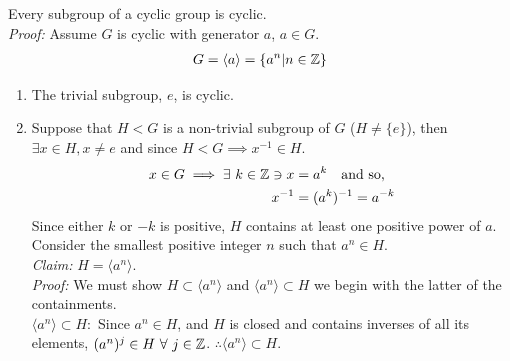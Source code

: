 \begin{proposition}
Every subgroup of a cyclic group is cyclic.\\
\textit{Proof:} Assume $G$ is cyclic with generator $a$, $a\in G$.
\begin{align}
    G=\langle a\rangle= \{a^n|n\in {\mathbb{Z}}\} \nonumber
\end{align}
\begin{enumerate}
    \item The trivial subgroup, $e$, is cyclic.
    \item Suppose that $H<G$ is a non-trivial subgroup of $G$  ($H\neq \{e\}$), then
    $\exists x\in H, x\neq e$ and since $H<G \implies x^{-1}\in H$.
    \begin{align}
        x\in G \implies \exists \ k \in {\mathbb{Z}} \ni x&=a^k \ \ \text{ and so,} \nonumber \\
        x^{-1}&=(a^k)^{-1}=a^{-k} \nonumber
    \end{align}
    Since either $k$ or $-k$ is positive, $H$ contains at least one positive power of $a$.\\
    Consider the smallest positive integer $n$ such that $a^n\in H$.\\
    \textit{Claim:} $H=\langle a^n \rangle $.\\
    \textit{Proof:} We must show $H\subset \langle a^n \rangle$ and $ \langle a^n \rangle \subset H$
    we begin with the latter of the containments.\\
    $\langle a^n \rangle \subset H:$ Since $a^n\in H$, and $H$ is closed and contains inverses of
    all its elements, $(a^n)^j\in H \ \forall \ j\in {\mathbb{Z}}$.
    $\therefore \langle a^n \rangle \subset H$.\steezybreak


\end{enumerate}
\end{proposition}
